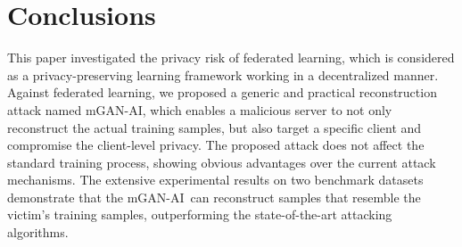 \documentclass[10pt, conference, letterpaper]{IEEEtran}
\newcommand{\alg}{mGAN-AI}
\begin{document}
\section{Conclusions}
\label{sec:conclusion}

This paper investigated the privacy risk of federated learning, which is considered as a privacy-preserving learning framework working in a decentralized manner. Against federated learning, we proposed a generic and practical reconstruction attack named \alg, which enables a malicious server to not only reconstruct the actual training samples, but also target a specific client and compromise the client-level privacy. The proposed attack does not affect the standard training process, showing obvious advantages over the current attack mechanisms.
The extensive experimental results on two benchmark datasets demonstrate that the \alg~can reconstruct samples that resemble the victim's training samples, outperforming the state-of-the-art attacking algorithms.


\balance

\end{document}
